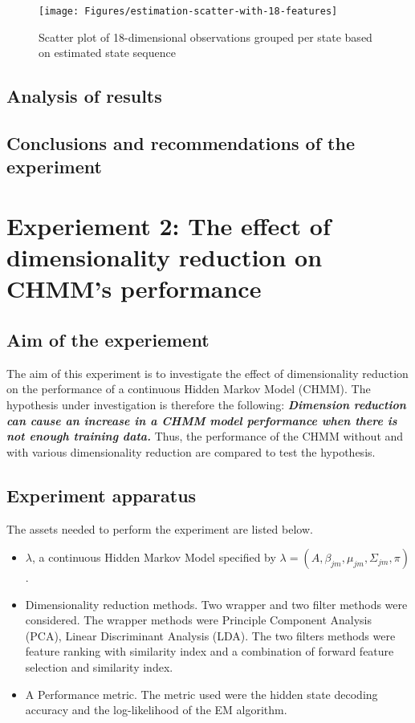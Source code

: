 \begin{figure}[ht!]
	\texttt{[image: Figures/estimation-scatter-with-18-features]}
	\caption{Scatter plot of 18-dimensional observations grouped per state based on estimated state sequence}
	\label{fig:es-18dim}
\end{figure}

\subsection{Analysis of results}

\subsection{Conclusions and recommendations of the experiment}

\section{Experiement 2: The effect of dimensionality reduction on CHMM's performance}

\subsection{Aim of the experiement}
The aim of this experiment is to investigate the effect of dimensionality reduction on the performance of a continuous Hidden Markov Model (CHMM).
The hypothesis under investigation is therefore the following:
\textbf{\textit{Dimension reduction can cause an increase in a CHMM model performance when there is not enough training data.}}
Thus, the performance of the CHMM without and with various dimensionality reduction are compared to test the hypothesis.

\subsection{Experiment apparatus}
The assets needed to perform the experiment are listed below.
\begin{itemize}
	\item \(\lambda\), a continuous Hidden Markov Model specified by \(\lambda = (A, \beta_{jm}, \mu_{jm}, \Sigma_{jm}, \pi)\).
	\item Dimensionality reduction methods. Two wrapper and two filter methods were considered. The wrapper methods were Principle Component Analysis (PCA), Linear Discriminant Analysis (LDA). The two filters methods were feature ranking with similarity index %
	and a combination of forward feature selection and similarity index.
	\item A Performance metric. The metric used were the hidden state decoding accuracy and the log-likelihood of the EM algorithm.
\end{itemize}


